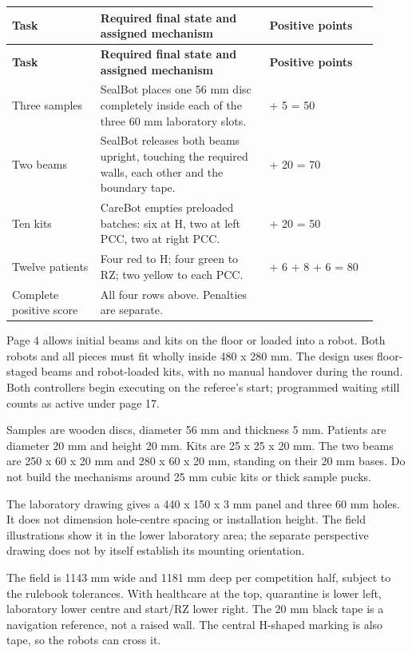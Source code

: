 \documentclass[10pt,a4paper]{article}
\begin{document}
\small\begin{longtable}{@{}>{\raggedright\arraybackslash}p{0.22\linewidth}>{\raggedright\arraybackslash}p{0.42\linewidth}>{\raggedright\arraybackslash}p{0.27\linewidth}@{}}
\toprule
\textbf{Task} & \textbf{Required final state and assigned mechanism} & \textbf{Positive points} \\
\midrule\endfirsthead
\toprule\textbf{Task} & \textbf{Required final state and assigned mechanism} & \textbf{Positive points} \\\midrule\endhead
Three samples & SealBot places one 56 mm disc completely inside each of the three 60 mm laboratory slots. & 45 + 5 = 50 \\[3pt]
Two beams & SealBot releases both beams upright, touching the required walls, each other and the boundary tape. & 50 + 20 = 70 \\[3pt]
Ten kits & CareBot empties preloaded batches: six at H, two at left PCC, two at right PCC. & 30 + 20 = 50 \\[3pt]
Twelve patients & Four red to H; four green to RZ; two yellow to each PCC. & 60 + 6 + 8 + 6 = 80 \\[3pt]
Complete positive score & All four rows above. Penalties are separate. & 250 \\[3pt]
\bottomrule\end{longtable}\normalsize
Page 4 allows initial beams and kits on the floor or loaded into a robot. Both robots and all pieces must fit wholly inside 480 x 280 mm. The design uses floor-staged beams and robot-loaded kits, with no manual handover during the round. Both controllers begin executing on the referee's start; programmed waiting still counts as active under page 17.

Samples are wooden discs, diameter 56 mm and thickness 5 mm. Patients are diameter 20 mm and height 20 mm. Kits are 25 x 25 x 20 mm. The two beams are 250 x 60 x 20 mm and 280 x 60 x 20 mm, standing on their 20 mm bases. Do not build the mechanisms around 25 mm cubic kits or thick sample pucks.

The laboratory drawing gives a 440 x 150 x 3 mm panel and three 60 mm holes. It does not dimension hole-centre spacing or installation height. The field illustrations show it in the lower laboratory area; the separate perspective drawing does not by itself establish its mounting orientation.

The field is 1143 mm wide and 1181 mm deep per competition half, subject to the rulebook tolerances. With healthcare at the top, quarantine is lower left, laboratory lower centre and start/RZ lower right. The 20 mm black tape is a navigation reference, not a raised wall. The central H-shaped marking is also tape, so the robots can cross it.
\end{document}
